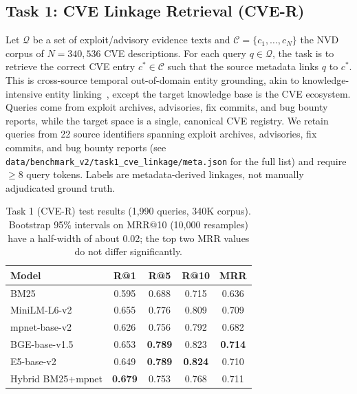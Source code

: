 \documentclass{article}
\begin{document}
\subsection{Task 1: CVE Linkage Retrieval (CVE-R)}
\label{sec:task1}

Let $\mathcal{Q}$ be a set of exploit/advisory evidence texts and $\mathcal{C} = \{c_1, \ldots, c_N\}$ the NVD corpus of $N{=}340{,}536$ CVE descriptions. For each query $q \in \mathcal{Q}$, the task is to retrieve the correct CVE entry $c^* \in \mathcal{C}$ such that the source metadata links $q$ to $c^*$. This is cross-source temporal out-of-domain entity grounding, akin to knowledge-intensive entity linking~\citep{petroni2021kilt}, except the target knowledge base is the CVE ecosystem. Queries come from exploit archives, advisories, fix commits, and bug bounty reports, while the target space is a single, canonical CVE registry. We retain queries from 22 source identifiers spanning exploit archives, advisories, fix commits, and bug bounty reports (see \texttt{data/benchmark\_v2/task1\_cve\_linkage/meta.json} for the full list) and require $\geq$8 query tokens. Labels are metadata-derived linkages, not manually adjudicated ground truth. 

\begin{table}
\vspace{-4pt}
\centering
\small
\setlength{\tabcolsep}{3pt}
\caption{Task 1 (CVE-R) test results (1,990 queries, 340K corpus). Bootstrap 95\% intervals on MRR@10 (10,000 resamples) have a half-width of about 0.02; the top two MRR values do not differ significantly.}
\label{tab:task1-results}
\begin{tabular}{lcccc}
\toprule
\textbf{Model} & \textbf{R@1} & \textbf{R@5} & \textbf{R@10} & \textbf{MRR} \\
\midrule
BM25 & 0.595 & 0.688 & 0.715 & 0.636 \\
MiniLM-L6-v2 & 0.655 & 0.776 & 0.809 & 0.709 \\
mpnet-base-v2 & 0.626 & 0.756 & 0.792 & 0.682 \\
BGE-base-v1.5 & 0.653 & \textbf{0.789} & 0.823 & \textbf{0.714} \\
E5-base-v2 & 0.649 & \textbf{0.789} & \textbf{0.824} & 0.710 \\
\midrule
Hybrid BM25+mpnet & \textbf{0.679} & 0.753 & 0.768 & 0.711 \\
\bottomrule
\end{tabular}
\vspace{-4pt}
\end{table}
\end{document}
